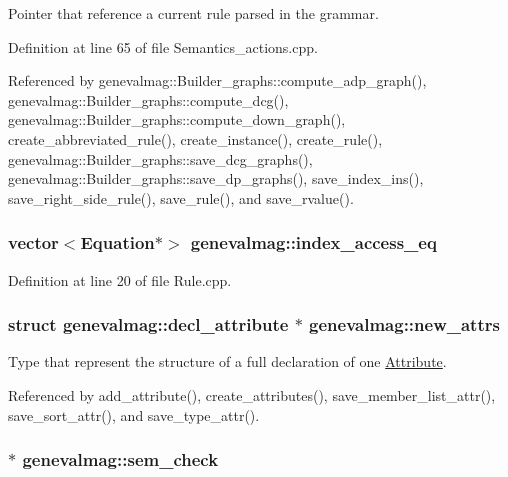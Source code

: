 Pointer that reference a current rule parsed in the grammar. 

Definition at line 65 of file Semantics\_\-actions.cpp.

Referenced by genevalmag::Builder\_\-graphs::compute\_\-adp\_\-graph(), genevalmag::Builder\_\-graphs::compute\_\-dcg(), genevalmag::Builder\_\-graphs::compute\_\-down\_\-graph(), create\_\-abbreviated\_\-rule(), create\_\-instance(), create\_\-rule(), genevalmag::Builder\_\-graphs::save\_\-dcg\_\-graphs(), genevalmag::Builder\_\-graphs::save\_\-dp\_\-graphs(), save\_\-index\_\-ins(), save\_\-right\_\-side\_\-rule(), save\_\-rule(), and save\_\-rvalue().\hypertarget{namespacegenevalmag_4bc1208b99175d15ec86291f80f5428f}{
\subsubsection[{index\_\-access\_\-eq}]{\setlength{\rightskip}{0pt plus 5cm}vector$<${\bf Equation}$\ast$$>$ {\bf genevalmag::index\_\-access\_\-eq}}}
\label{namespacegenevalmag_4bc1208b99175d15ec86291f80f5428f}




Definition at line 20 of file Rule.cpp.\hypertarget{namespacegenevalmag_3564619b24ff1e9243dee9e501181679}{
\subsubsection[{new\_\-attrs}]{\setlength{\rightskip}{0pt plus 5cm}struct {\bf genevalmag::decl\_\-attribute} $\ast$ {\bf genevalmag::new\_\-attrs}}}
\label{namespacegenevalmag_3564619b24ff1e9243dee9e501181679}


Type that represent the structure of a full declaration of one \hyperlink{classgenevalmag_1_1Attribute}{Attribute}. 

Referenced by add\_\-attribute(), create\_\-attributes(), save\_\-member\_\-list\_\-attr(), save\_\-sort\_\-attr(), and save\_\-type\_\-attr().\hypertarget{namespacegenevalmag_d93efa78140ac10eefb71fdb44c48b6b}{
\subsubsection[{sem\_\-check}]{$\ast$ {\bf genevalmag::sem\_\-check}}}
\label{namespacegenevalmag_d93efa78140ac10eefb71fdb44c48b6b}




